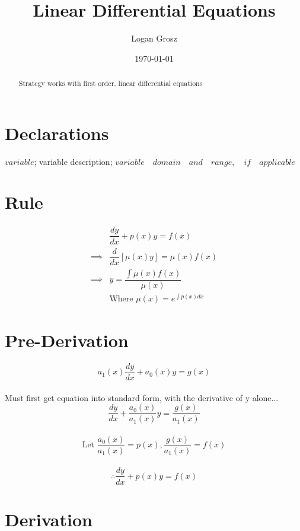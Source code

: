 \documentclass{article}
\begin{document}
	
\author{Logan Grosz}
\title{Linear Differential Equations}
\date{\today}

\maketitle

\begin{abstract}
	Strategy works with first order, linear differential equations
\end{abstract}

\section{Declarations}

$variable$; variable description; $variable\quad domain\quad and\quad range,\quad if\quad applicable$

\section{Rule}

\begin{align*}
&\dfrac{dy}{dx}+p(x)y=f(x)\\
\implies&\dfrac{d}{dx}[\mu(x)y]=\mu(x)f(x)\\
\implies&y=\dfrac{\int\mu(x)f(x)}{\mu(x)}\\
&\text{Where }\mu(x)=e^{\int p(x)dx}
\end{align*}

\section{Pre-Derivation}
$$a_1(x)\dfrac{dy}{dx}+a_0(x)y=g(x)$$\\
Must first get equation into standard form, with the derivative of y alone...
$$\dfrac{dy}{dx}+\dfrac{a_0(x)}{a_1(x)}y=\dfrac{g(x)}{a_1(x)}$$\\
$$\text{Let }\dfrac{a_0(x)}{a_1(x)}=p(x),\dfrac{g(x)}{a_1(x)}=f(x)$$\\
$$\therefore\dfrac{dy}{dx}+p(x)y=f(x)$$

\section{Derivation}
\end{document}
